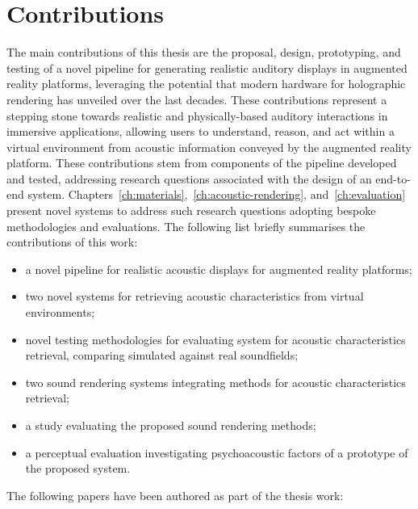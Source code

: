 \section{Contributions}
The main contributions of this thesis are the proposal, design, prototyping, and testing of a novel pipeline for generating realistic auditory displays in augmented reality platforms, leveraging the potential that modern hardware for holographic rendering has unveiled over the last decades. These contributions represent a stepping stone towards realistic and physically-based auditory interactions in immersive applications, allowing users to understand, reason, and act within a virtual environment from acoustic information conveyed by the augmented reality platform.
These contributions stem from components of the pipeline developed and tested, addressing research questions associated with the design of an end-to-end system. Chapters~\ref{ch:materials},~\ref{ch:acoustic-rendering}, and~\ref{ch:evaluation} present novel systems to address such research questions adopting bespoke methodologies and evaluations. The following list briefly summarises the contributions of this work:
\begin{itemize}
    \item a novel pipeline for realistic acoustic displays for augmented reality platforms;
    \item two novel systems for retrieving acoustic characteristics from virtual environments;
    \item novel testing methodologies for evaluating system for acoustic characteristics retrieval, comparing simulated against real soundfields;
    \item two sound rendering systems integrating methods for acoustic characteristics retrieval;
    \item a study evaluating the proposed sound rendering methods;
    \item a perceptual evaluation investigating psychoacoustic factors of a prototype of the proposed system.
\end{itemize}

The following papers have been authored as part of the thesis work:

